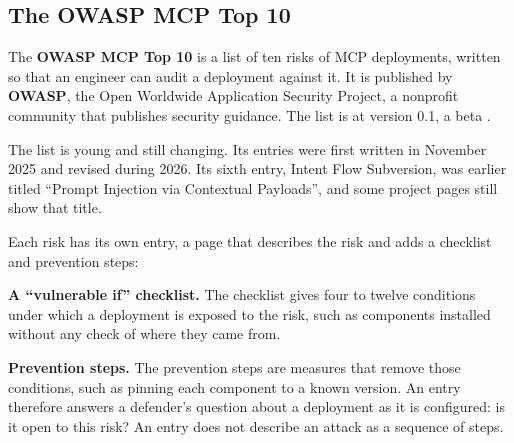 \subsection{The OWASP MCP Top 10}
\label{sec:threats-owasp}

The \textbf{OWASP MCP Top 10} is a list of ten risks of MCP deployments, written so that an
engineer can audit a deployment against it. It is published by \textbf{OWASP}, the Open Worldwide
Application Security Project, a nonprofit community that publishes security guidance. The list is
at version 0.1, a beta \citep{owasp-mcp-top10}.

The list is young and still changing. Its entries were first written in November 2025 and revised
during 2026. Its sixth entry, Intent Flow Subversion, was earlier titled ``Prompt Injection via
Contextual Payloads'', and some project pages still show that title.

Each risk has its own entry, a page that describes the risk and adds a checklist and prevention
steps:
\bi
\item \textbf{A ``vulnerable if'' checklist.} The checklist gives four to twelve conditions under
which a deployment is exposed to the risk, such as components installed without any check of where
they came from.
\item \textbf{Prevention steps.} The prevention steps are measures that remove those conditions,
such as pinning each component to a known version.
\ei
An entry therefore answers a defender's question about a deployment as it is configured: is it
open to this risk? An entry does not describe an attack as a sequence of steps.

